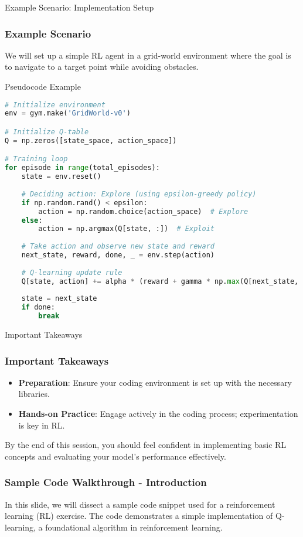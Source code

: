 \documentclass[aspectratio=169]{beamer}
\begin{document}
\begin{frame}[fragile]{Example Scenario: Implementation Setup}
    \frametitle{Example Scenario}
    We will set up a simple RL agent in a grid-world environment where the goal is to navigate to a target point while avoiding obstacles.

    \begin{block}{Pseudocode Example}
    \begin{lstlisting}[language=Python]
# Initialize environment
env = gym.make('GridWorld-v0')

# Initialize Q-table
Q = np.zeros([state_space, action_space])

# Training loop
for episode in range(total_episodes):
    state = env.reset()
    
    # Deciding action: Explore (using epsilon-greedy policy)
    if np.random.rand() < epsilon:
        action = np.random.choice(action_space)  # Explore
    else:
        action = np.argmax(Q[state, :])  # Exploit
    
    # Take action and observe new state and reward
    next_state, reward, done, _ = env.step(action)
    
    # Q-learning update rule
    Q[state, action] += alpha * (reward + gamma * np.max(Q[next_state, :]) - Q[state, action])
    
    state = next_state
    if done:
        break
    \end{lstlisting}
    \end{block}
\end{frame}

\begin{frame}{Important Takeaways}
    \frametitle{Important Takeaways}
    \begin{itemize}
        \item \textbf{Preparation}: Ensure your coding environment is set up with the necessary libraries.
        \item \textbf{Hands-on Practice}: Engage actively in the coding process; experimentation is key in RL.
    \end{itemize}
    By the end of this session, you should feel confident in implementing basic RL concepts and evaluating your model's performance effectively.
\end{frame}

\begin{frame}[fragile]
    \frametitle{Sample Code Walkthrough - Introduction}
    In this slide, we will dissect a sample code snippet used for a reinforcement learning (RL) exercise. 
    The code demonstrates a simple implementation of Q-learning, a foundational algorithm in reinforcement learning.
\end{frame}
\end{document}
